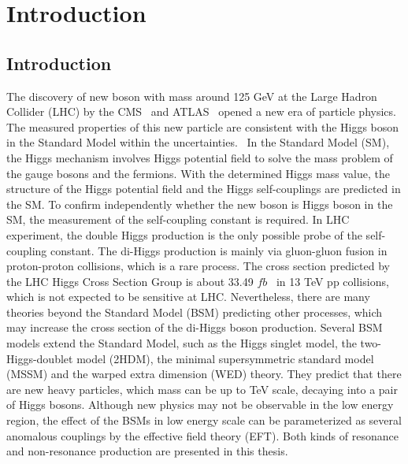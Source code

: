 \chapter{Introduction} %

\label{Chapter1} %


\section{Introduction}

The discovery of new boson with mass around 125 GeV at the Large Hadron Collider (LHC) by the CMS~\cite{1207.7235} and ATLAS~\cite{1207.7214} opened a new era of particle physics.
The measured properties of this new particle are consistent with the Higgs boson in the Standard Model within the uncertainties.~\cite{1606.02266}
In the Standard Model (SM), the Higgs mechanism involves Higgs potential field to solve the mass problem of the gauge bosons and the fermions. %
With the determined Higgs mass value, the structure of the Higgs potential field and the Higgs self-couplings are predicted in the SM.
To confirm independently whether the new boson is Higgs boson in the SM, the measurement of the self-coupling constant is required.
In LHC experiment, the double Higgs production is the only possible probe of the self-coupling constant.
The di-Higgs production is mainly via gluon-gluon fusion in proton-proton collisions, which is a rare process.
The cross section predicted by the LHC Higgs Cross Section Group is about 33.49 $fb$~\cite{1610.07922} in 13 TeV pp collisions, which is not expected to be sensitive at LHC.
Nevertheless, there are many theories beyond the Standard Model (BSM) predicting other processes, which may increase the cross section of the di-Higgs boson production.
Several BSM models extend the Standard Model, such as the Higgs singlet model, the two-Higgs-doublet model (2HDM), the minimal supersymmetric standard model (MSSM) and the warped extra dimension (WED) theory.
They predict that there are new heavy particles, which mass can be up to TeV scale, decaying into a pair of Higgs bosons.
Although new physics may not be observable in the low energy region, the effect of the BSMs in low energy scale can be parameterized as several anomalous couplings by the effective field theory (EFT).
Both kinds of resonance and non-resonance production are presented in this thesis.


